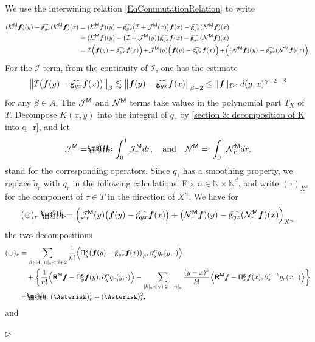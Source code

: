 \documentclass[10pt, reqno]{amsart}
\makeatletter
\numberwithin{subsection}{section}
\numberwithin{subsubsection}{subsection}
\numberwithin{equation}{section} %
\newenvironment{Dem}[1][\unskip]{%
    \begin{list}{\hspace{1.15cm}{\sf \textbf{{\small Proof #1 --}}}}{%
        \setlength{\topsep}{0pt}%
        \setlength{\leftmargin}{0pt}%
        \setlength{\rightmargin}{0pt}%
        \setlength{\listparindent}{0pt}%
        \setlength{\itemindent}{0pt}%
        \setlength{\parsep}{0pt}%
        \addtolength{\leftmargin}{0pt}%
        \addtolength{\rightmargin}{0pt}%
    } \item }{\hfill $\rhd$\end{list}\smallskip}
\theoremstyle{mystyle}
\theoremstyle{mystyle2}
\theoremstyle{mystyle3}
\newcommand{\admi}{\mathcal{J}}
\newcommand{\remind}{\mathcal{N}}
\newcommand{\bsf}{\boldsymbol{f}}
\newcommand\bbN{\mathbb{N}}
\newcommand{\mcD}{\mathcal{D}}
\newcommand{\mcI}{\mathcal{I}}
\newcommand{\mcJ}{\mathcal{J}}
\newcommand{\mcK}{\mathcal{K}}
\newcommand{\mcN}{\mathcal{N}}
\newcommand*{\defeq}{\mathrel{\rlap{%
                     \raisebox{0.3ex}{$\m@th\cdot$}}%
                     \raisebox{-0.3ex}{$\m@th\cdot$}}%
                     =}
\newcommand*{\eqdef}{=\mathrel{\rlap{%
                     \raisebox{0.3ex}{$\m@th\cdot$}}%
                     \raisebox{-0.3ex}{$\m@th\cdot$}}%
                     }
\makeatother
\begin{document}
\begin{Dem}[of Theorem \ref{thm wellposedness of K}] 
{\small 
We use the interwining relation \eqref{EqCommutationRelation} to write

\begin{align*}
(\mcK^{\sf M}\bsf)(y) - \widehat{{\sf g}_{yx}}(\mcK^{\sf M}\bsf)(x)
&= (\mcK^{\sf M}\bsf)(y) - \widehat{{\sf g}_{yx}} \big(\mcI+\mcJ^{\sf M}(x)\big)\bsf(x) - \widehat{{\sf g}_{yx}}(\mcN^{\sf M}\bsf)(x)   \\
&=  (\mcK^{\sf M}\bsf)(y) - \big(\mcI+\mcJ^{\sf M}(y)\big)\widehat{{\sf 
g}_{yx}}\bsf(x) - \widehat{{\sf g}_{yx}}(\mcN^{\sf M}\bsf)(x)   \\
&= \mcI\Big(\bsf(y) - \widehat{{\sf g}_{yx}}\bsf(x)\Big) \hspace{-0.05cm}+\hspace{-0.05cm} \mcJ^{\sf M}(y)\Big(\bsf(y) - \widehat{{\sf g}_{yx}}\bsf(x)\Big) \hspace{-0.05cm}+\hspace{-0.05cm} \Big((\mcN^{\sf M}\bsf)(y) - \widehat{{\sf g}_{yx}}(\mcN^{\sf M}\bsf)(x)\Big).
\end{align*}
For the $\mcI$ term, from the continuity of $\mcI$, one has the estimate
$$
\big\|\mcI\big(\bsf(y) - \widehat{{\sf g}_{yx}}\bsf(x)\big)\big\|_\beta \lesssim \big\| \bsf(y) - \widehat{{\sf g}_{yx}}\bsf(x) \big\|_{\beta-2} \leq \|\bsf\|_{\mcD^\gamma} \, d(y,x)^{\gamma+2-\beta}
$$
for any $\beta\in A$. The $\mcJ^{\sf M}$ and $\mcN^{\sf M}$ terms take values in the polynomial part $T_X$ of $T$. Decompose $K(x,y)$ into the integral of $\widetilde{q}_r$ by \eqref{section 3: decomposition of K into q_r}, and let 
$$
\admi^{\sf M} \eqdef \int_0^1 \admi^{\sf M}_rdr, \quad \textrm{and} \quad \remind^{\sf M} = :\int_0^1\remind^{\sf M}_rdr,
$$ 
stand for the corresponding operators. Since $q_1$ has a smoothing property, we replace $\widetilde{q}_r$ with $q_r$ in the following calculations. Fix $n\in\bbN\times\bbN^d$, and write $(\tau)_{X^n}$ for the component 
of $\tau\in T$ in the direction of $X^n$.
We have for 
$$
(\circleddash)_r \defeq  
\Big( \mcJ^{\sf M}_r(y)\big(\bsf(y) - \widehat{{\sf g}_{yx}}\bsf(x)\big) + \big(\mcN^{\sf M}_r\bsf)(y) - \widehat{{\sf g}_{yx}}(\mcN^{\sf M}_r\bsf)(x)\Big)_{X^n}
$$
the two decompositions
\begin{align*}
(\circleddash)_r &= \sum_{\beta\in A, |n|_{\frak{s}}<\beta+2}
\frac1{n!} \Big\langle {\sf\Pi}^{\sf g}_y \big(\bsf(y) - \widehat{{\sf g}_{yx}}\bsf(x)\big)_\beta, \partial_y^n q_r(y,\cdot) \Big\rangle\\
&\quad+ \bigg\{
\frac1{n!} \Big\langle \textbf{\textsf{R}}^{\sf M}\bsf - {\sf\Pi}_y^{\sf g}\bsf(y) , \partial_y^n q_r(y,\cdot) \Big\rangle
-\sum_{|k|_{\frak{s}}<\gamma+2-|n|_{\frak{s}}} \frac{(y-x)^k}{k!} \Big\langle \textbf{\textsf{R}}^{\sf M}\bsf - {\sf\Pi}_x^{\sf g}\bsf(x) , \partial_x^{n+k}q_r(x,\cdot) \Big\rangle \bigg\}   \\
&\eqdef (\Asterisk)^1_r + (\Asterisk)^2_r,
\end{align*}
and

}
\end{Dem}
\end{document}
